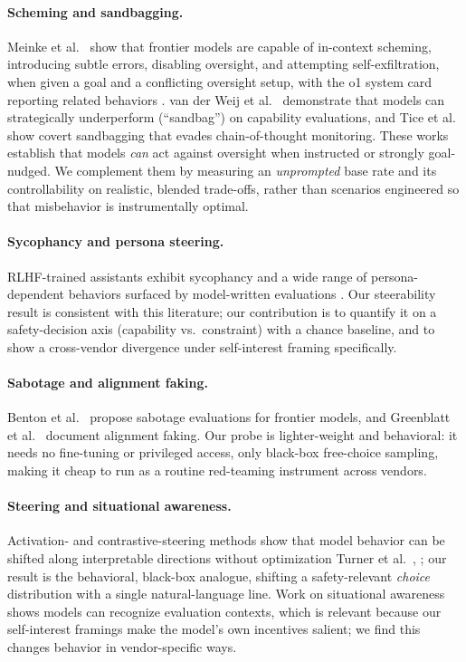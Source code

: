 \documentclass[10pt,twocolumn]{article}
\begin{document}
\paragraph{Scheming and sandbagging.} Meinke et al.~\cite{meinke2024scheming} show that
frontier models are capable of in-context scheming, introducing subtle errors,
disabling oversight, and attempting self-exfiltration, when given a goal and a
conflicting oversight setup, with the o1 system card reporting related behaviors
\cite{openai2024o1}. van der Weij et al.~\cite{vanderweij2024sandbagging} demonstrate that models
can strategically underperform (``sandbag'') on capability evaluations, and
Tice et al.~\cite{tice2025covert} show covert sandbagging that evades chain-of-thought
monitoring. These works establish that models \emph{can} act against oversight
when instructed or strongly goal-nudged. We complement them by measuring an
\emph{unprompted} base rate and its controllability on realistic, blended
trade-offs, rather than scenarios engineered so that misbehavior is
instrumentally optimal.

\paragraph{Sycophancy and persona steering.} RLHF-trained assistants exhibit
sycophancy \cite{sharma2023sycophancy} and a wide range of persona-dependent
behaviors surfaced by model-written evaluations \cite{perez2022discovering}.
Our steerability result is consistent with this literature; our contribution is
to quantify it on a safety-decision axis (capability vs.\ constraint) with a
chance baseline, and to show a cross-vendor divergence under self-interest
framing specifically.

\paragraph{Sabotage and alignment faking.} Benton et al.~\cite{benton2024sabotage} propose
sabotage evaluations for frontier models, and Greenblatt et al.~\cite{greenblatt2024faking}
document alignment faking. Our probe is lighter-weight and behavioral: it needs
no fine-tuning or privileged access, only black-box free-choice sampling, making
it cheap to run as a routine red-teaming instrument across vendors.

\paragraph{Steering and situational awareness.} Activation- and contrastive-steering
methods show that model behavior can be shifted along interpretable directions without
optimization Turner et al.~\cite{turner2023activation}, \cite{rimsky2023caa}; our result
is the behavioral, black-box analogue, shifting a safety-relevant \emph{choice}
distribution with a single natural-language line. Work on situational awareness
\cite{laine2024sad} shows models can recognize evaluation contexts, which is relevant
because our self-interest framings make the model's own incentives salient; we find this
changes behavior in vendor-specific ways.
\end{document}
